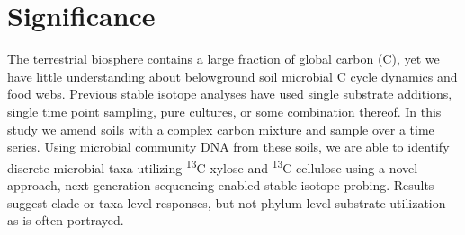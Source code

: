 \section{Significance} 
The terrestrial biosphere contains a large fraction of global carbon (C), yet we have little understanding about belowground soil microbial C cycle dynamics and food webs. Previous stable isotope analyses have used single substrate additions, single time point sampling, pure cultures, or some combination thereof.  In this study we amend soils with a complex carbon mixture and sample over a time series. Using microbial community DNA from these soils, we are able to identify discrete microbial taxa utilizing \textsuperscript{13}C-xylose and \textsuperscript{13}C-cellulose using a novel approach, next generation sequencing enabled stable isotope probing. Results suggest clade or taxa level responses, but not phylum level substrate utilization as is often portrayed.  